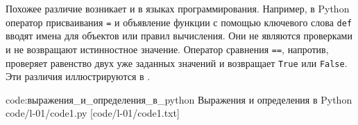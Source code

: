 Похожее различие возникает и в языках программирования.
Например, в Python оператор присваивания \texttt{=} и объявление функции с помощью ключевого слова \texttt{def} вводят имена для объектов или правил вычисления.
Они не являются проверками и не возвращают истинностное значение.
Оператор сравнения \texttt{==}, напротив, проверяет равенство двух уже заданных значений и возвращает \texttt{True} или \texttt{False}.
Эти различия иллюстрируются в .

\code
    {code:выражения_и_определения_в_python}
    {Выражения и определения в Python}
    {code/l-01/code1.py}
    [code/l-01/code1.txt]